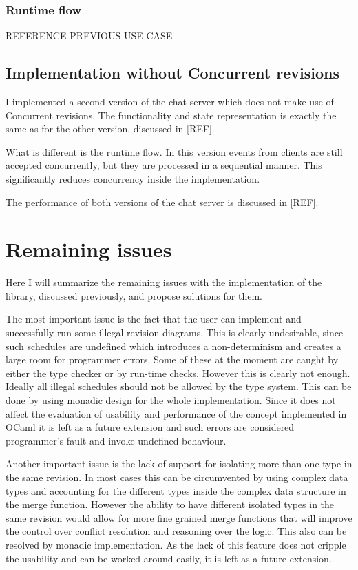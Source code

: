 \documentclass[12pt,twoside,notitlepage]{report}
\begin{document}
\subsubsection{Runtime flow}

REFERENCE PREVIOUS USE CASE 

\subsection{Implementation without Concurrent revisions}
I implemented a second version of the chat server which does not make use of Concurrent revisions. The functionality and state representation is exactly the same as for the other version, discussed in [REF].

What is different is the runtime flow. In this version events from clients are still accepted concurrently, but they are processed in a sequential manner. This significantly reduces concurrency inside the implementation. 

The performance of both versions of the chat server is discussed in [REF].

\section{Remaining issues}

Here I will summarize the remaining issues with the implementation of the library, discussed previously, and propose solutions for them.

The most important issue is the fact that the user can implement and successfully run some illegal revision diagrams. This is clearly undesirable, since such schedules are undefined which introduces a non-determinism and creates a large room for programmer errors. Some of these at the moment are caught by either the type checker or by run-time checks. However this is clearly not enough. Ideally all illegal schedules should not be allowed by the type system. This can be done by using monadic design for the whole implementation. Since it does not affect the evaluation of usability and performance of the concept implemented in OCaml it is left as a future extension and such errors are considered programmer's fault and invoke undefined behaviour.

Another important issue is the lack of support for isolating more than one type in the same revision. In most cases this can be circumvented by using complex data types and accounting for the different types inside the complex data structure in the merge function. However the ability to have different isolated types in the same revision would allow for more fine grained merge functions that will improve the control over conflict resolution and reasoning over the logic. This also can be resolved by monadic implementation. As the lack of this feature does not cripple the usability and can be worked around easily, it is left as a future extension. 
\end{document}
